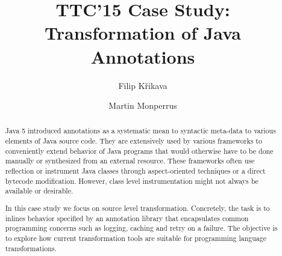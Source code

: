 \documentclass{eptcs}
\title{TTC'15 Case Study: Transformation of Java Annotations}
\author{
  Filip Křikava
  \institute{INRIA Lille}
  \institute{France}
  \email{\href{mailto:filip.krikava@inria.fr}{filip.krikava@inria.fr}}
\and
  Martin Monperrus
  \institute{University Lille 1 / INRIA Lille}
  \institute{France}
  \email{\href{mailto:martin.monperrus@univ-lille1.fr}{martin.monperrus@univ-lille1.fr}}
}
\begin{document}
\maketitle

\begin{abstract}

Java 5 introduced annotations as a systematic mean to syntactic meta-data to various elements of Java source code.
They are extensively used by various frameworks to conveniently extend behavior of Java programs that would otherwise have to be done manually or synthesized from an external resource.
These frameworks often use reflection or instrument Java classes through aspect-oriented techniques or a direct bytecode modification.
However, class level instrumentation might not always be available or desirable.

In this case study we focus on source level transformation.
Concretely, the task is to inlines behavior specified by an annotation library that encapsulates common programming concerns such as logging, caching and retry on a failure.
The objective is to explore how current transformation tools are suitable for programming language transformations.
\end{abstract}






% 	

\appendix


\end{document}

